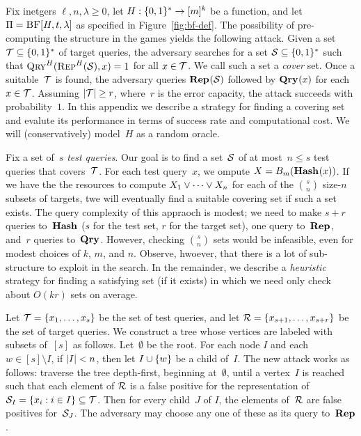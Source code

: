\label{app:unsalted-attack}
Fix inetgers $\ell, n, \lambda \geq0$, let $H:\{0,1\}^*\to[m]^k$ be a function,  and let
$\Pi = \textnormal{\textsc{BF}}[H,t,\lambda]$ as specified in Figure~\ref{fig:bf-def}.
%
The possibility of pre-computing the structure in the  games yields the
following attack. Given a set $\mathcal{T}\subseteq\{0,1\}^*$ of target queries, the
adversary searches for a set $\mathcal{S}\subseteq\{0,1\}^*$ such that
$\textnormal{\textsc{Qry}}^H(\textnormal{\textsc{Rep}}^H(\mathcal{S}), x) = 1$ for all $x \in \mathcal{T}$. We call such a set a
\emph{cover} set.
%
Once a suitable~$\mathcal{T}$ is found, the adversary queries $\textup{\textbf{Rep}}\hspace{0.5pt}(\mathcal{S})$ followed
by $\textup{\textbf{Qry}}\hspace{0.5pt}(x)$ for each $x\in\mathcal{T}$.
%
Assuming $|\mathcal{T}| \geq r$, where~$r$ is the error capacity, the attack succeeds
with probability~$1$.
%
In this appendix we describe a strategy for finding a covering set and evalute
its performance in terms of success rate and computational cost. We will
(conservatively) model~$H$ as a random oracle.

Fix a set of~$s$ \emph{test queries}. Our goal is to find a set~$\mathcal{S}$ of at
most~$n \leq s$ test queries that covers~$\mathcal{T}$.
%
For each test query~$x$, we ompute $X = {B}_m(\textup{\textbf{Hash}}\hspace{0.5pt}(x))$. If we have the the
resources to compute $X_1 \vee \cdots \vee X_n$ for each of the ${s}\choose{n}$
size-$n$ subsets of targets, twe will eventually find a suitable covering set if
such a set exists.
%
The query complexity of this appraoch is modest; we need to make $s+r$ queries
to~$\textup{\textbf{Hash}}\hspace{0.5pt}$ ($s$ for the test set, $r$ for the target set), one query
to~$\textup{\textbf{Rep}}\hspace{0.5pt}$, and~$r$ queries to~$\textup{\textbf{Qry}}\hspace{0.5pt}$. However, checking $\binom{s}{n}$ sets
would be infeasible, even for modest choices of $k$, $m$, and $n$. Observe,
hwoever, that there is a lot of sub-structure to exploit in the search.
%
In the remainder, we describe a \emph{heuristic} strategy for finding a
satisfying set (if it exists) in which we need only check about $O(kr)$ sets on
average.

Let $\mathcal{T} = \{x_1, \ldots, x_s\}$ be the set of test queries, and let $\mathcal{R} =
\{x_{s+1}, \ldots, x_{s+r}\}$ be the set of target queries.
%
We construct a tree whose vertices are labeled with subsets of~$[s]$ as follows.
%
Let~$\emptyset$ be the root.
%
For each node $I$ and each $w \in [s] \setminus I$, if $|I| < n$, then let $I
\cup \{ w \}$ be a child of~$I$.
%
The new attack works as follows: traverse the tree depth-first, beginning
at~$\emptyset$, until a vertex~$I$ is reached such that each element of $\mathcal{R}$ is
a false positive for the representation of $\mathcal{S}_I = \{ x_i : i \in I \}
\subseteq \mathcal{T}$.
%
Then for every child~$J$ of $I$, the elements of~$\mathcal{R}$ are false positives
for~$\mathcal{S}_J$. The adversary may choose any one of these as its query
to~$\textup{\textbf{Rep}}\hspace{0.5pt}$.

